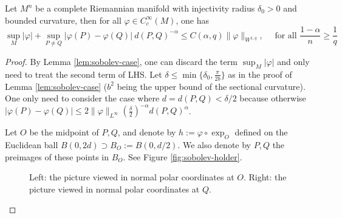\begin{lemma}
\label{lem:sobolev-case-holder}
Let \(M^n\) be a complete Riemannian manifold with injectivity radius \(\delta_0>0\)
and bounded curvature, then for all \(\varphi\in C_c^\infty(M)\), one
has
\[
\sup_M |\varphi| + \sup_{P\ne Q} |\varphi(P) -\varphi(Q)|\ d(P,Q)^{-\alpha} \leq
C(\alpha,q) \|\varphi\|_{W^{1,q}},\quad \text{ for all } \frac{1-\alpha}{n}\geq \frac{1}{q}
\]
\end{lemma}
\begin{proof}
By Lemma \ref{lem:sobolev-case}, one can discard the term \(\sup_M |\varphi|\) and only
need to treat the second term of LHS. Let \(\delta \leq \min\{\delta_0, \frac{\pi}{2b}\}\) as in the proof of Lemma \ref{lem:sobolev-case} (\(b^2\) being the upper bound of the
sectional curvature). One only need to consider the case where \(d=d(P,Q) <\delta/2\)
because otherwise \(|\varphi(P)-\varphi(Q)| \leq 2\|\varphi \|_{L^\infty}(\frac{\delta}{2})^{-\alpha}d(P,Q)^\alpha\).

Let \(O\) be the midpoint of \(P,Q\), and denote by \(h:=\varphi\circ\exp_O\)
defined on the Euclidean ball \(B(0,2d)\supset B_O:=B(0,d/2)\). We also denote by \(P,Q\) the
preimages of these points in \(B_O\). See Figure \ref{fig:sobolev-holder}.

\label{fig:sobolev-holder}
\begin{figure}[htbp]
\centering

\caption{Left: the picture viewed in normal polar coordinates at \(O\). Right: the picture viewed in normal polar coordinates at \(Q\).}
\end{figure}


\end{proof}
